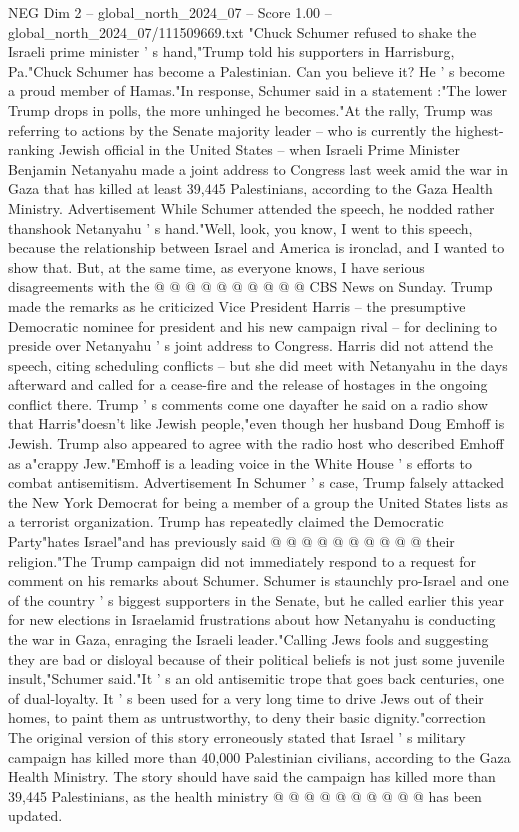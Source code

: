 \begin{textsample}{NEG Dim 2 – global\_north\_2024\_07 – Score 1.00 – global\_north\_2024\_07/111509669.txt}  \label{ex:f2_neg_257}
"Chuck Schumer refused to shake the Israeli prime minister ' s hand,"Trump told his supporters in Harrisburg, Pa."Chuck Schumer has become a Palestinian.
Can you believe it?
He ' s become a proud member of Hamas."In response, Schumer said in a statement :"The lower Trump drops in polls, the more unhinged he becomes."At the rally, Trump was referring to actions by the Senate majority leader -- who is currently the highest-ranking Jewish official in the United States -- when Israeli Prime Minister Benjamin Netanyahu made a joint address to Congress last week amid the war in Gaza that has killed at least 39,445 Palestinians, according to the Gaza Health Ministry.
Advertisement While Schumer attended the speech, he nodded rather thanshook Netanyahu ' s hand."Well, look, you know, I went to this speech, because the relationship between Israel and America is ironclad, and I wanted to show that.
But, at the same time, as everyone knows, I have serious disagreements with the @ @ @ @ @ @ @ @ @ @ CBS News on Sunday.
Trump made the remarks as he criticized Vice President Harris -- the presumptive Democratic nominee for president and his new campaign rival -- for declining to preside over Netanyahu ' s joint address to Congress.
Harris did not attend the speech, citing scheduling conflicts -- but she did meet with Netanyahu in the days afterward and called for a cease-fire and the release of hostages in the ongoing conflict there.
Trump ' s comments come one dayafter he said on a radio show that Harris"doesn't like Jewish people,"even though her husband Doug Emhoff is Jewish.
Trump also appeared to agree with the radio host who described Emhoff as a"crappy Jew."Emhoff is a leading voice in the White House ' s efforts to combat antisemitism.
Advertisement In Schumer ' s case, Trump falsely attacked the New York Democrat for being a member of a group the United States lists as a terrorist organization.
Trump has repeatedly claimed the Democratic Party"hates Israel"and has previously said @ @ @ @ @ @ @ @ @ @ their religion."The Trump campaign did not immediately respond to a request for comment on his remarks about Schumer.
Schumer is staunchly pro-Israel and one of the country ' s biggest supporters in the Senate, but he called earlier this year for new elections in Israelamid frustrations about how Netanyahu is conducting the war in Gaza, enraging the Israeli leader."Calling Jews fools and suggesting they are bad or disloyal because of their political beliefs is not just some juvenile insult,"Schumer said."It ' s an old antisemitic trope that goes back centuries, one of dual-loyalty.
It ' s been used for a very long time to drive Jews out of their homes, to paint them as untrustworthy, to deny their basic dignity."correction The original version of this story erroneously stated that Israel ' s military campaign has killed more than 40,000 Palestinian civilians, according to the Gaza Health Ministry.
The story should have said the campaign has killed more than 39,445 Palestinians, as the health ministry @ @ @ @ @ @ @ @ @ @ has been updated.

\end{textsample}
